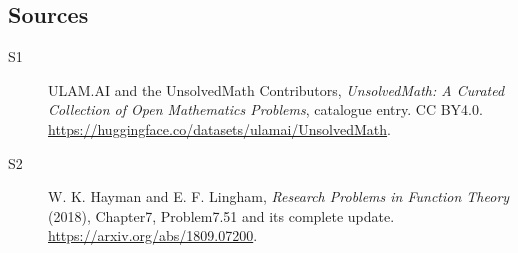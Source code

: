 \documentclass[11pt]{article}
\begin{document}
\subsection{Sources}
\begin{description}
\item[\hypertarget{source:statement:1}{S1}] ULAM.AI and the UnsolvedMath Contributors, \emph{UnsolvedMath: A Curated Collection of Open Mathematics Problems}, catalogue entry. CC BY4.0. \url{https://huggingface.co/datasets/ulamai/UnsolvedMath}.
\item[\hypertarget{source:statement:2}{S2}] W. K. Hayman and E. F. Lingham, \emph{Research Problems in Function Theory} (2018), Chapter7, Problem7.51 and its complete update. \url{https://arxiv.org/abs/1809.07200}.
\end{description}
\label{end:statement}
\end{document}
